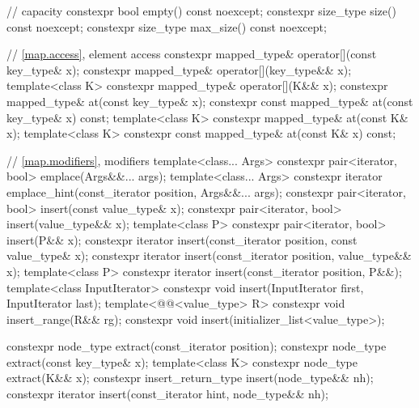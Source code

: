 \begin{codeblock}
{{    // capacity
    constexpr bool empty() const noexcept;
    constexpr size_type size() const noexcept;
    constexpr size_type max_size() const noexcept;

    // \ref{map.access}, element access
    constexpr mapped_type& operator[](const key_type& x);
    constexpr mapped_type& operator[](key_type&& x);
    template<class K> constexpr mapped_type& operator[](K&& x);
    constexpr mapped_type&       at(const key_type& x);
    constexpr const mapped_type& at(const key_type& x) const;
    template<class K> constexpr mapped_type&       at(const K& x);
    template<class K> constexpr const mapped_type& at(const K& x) const;

    // \ref{map.modifiers}, modifiers
    template<class... Args> constexpr pair<iterator, bool> emplace(Args&&... args);
    template<class... Args>
      constexpr iterator emplace_hint(const_iterator position, Args&&... args);
    constexpr pair<iterator, bool> insert(const value_type& x);
    constexpr pair<iterator, bool> insert(value_type&& x);
    template<class P> constexpr pair<iterator, bool> insert(P&& x);
    constexpr iterator insert(const_iterator position, const value_type& x);
    constexpr iterator insert(const_iterator position, value_type&& x);
    template<class P>
      constexpr iterator insert(const_iterator position, P&&);
    template<class InputIterator>
      constexpr void insert(InputIterator first, InputIterator last);
    template<@@<value_type> R>
      constexpr void insert_range(R&& rg);
    constexpr void insert(initializer_list<value_type>);

    constexpr node_type extract(const_iterator position);
    constexpr node_type extract(const key_type& x);
    template<class K> constexpr node_type extract(K&& x);
    constexpr insert_return_type insert(node_type&& nh);
    constexpr iterator           insert(const_iterator hint, node_type&& nh);

}}
\end{codeblock}
